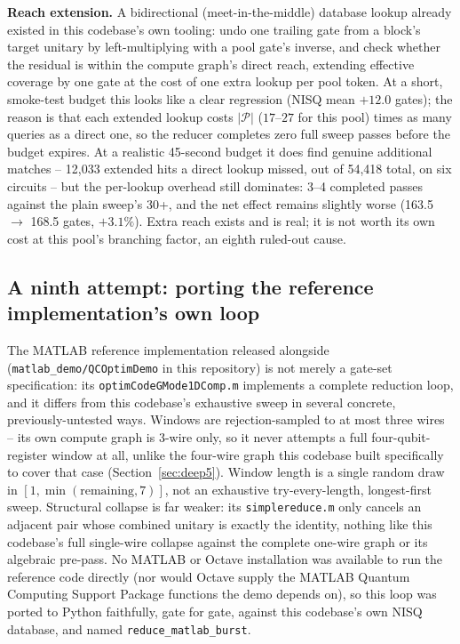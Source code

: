 \documentclass[11pt]{article}
\begin{document}
\textbf{Reach extension.} A bidirectional (meet-in-the-middle) database
lookup already existed in this codebase's own tooling: undo one trailing
gate from a block's target unitary by left-multiplying with a pool gate's
inverse, and check whether the residual is within the compute graph's
direct reach, extending effective coverage by one gate at the cost of one
extra lookup per pool token. At a short, smoke-test budget this looks like
a clear regression (NISQ mean $+12.0$ gates); the reason is that each
extended lookup costs $|\mathcal{P}|$ ($17$--$27$ for this pool) times as
many queries as a direct one, so the reducer completes zero full sweep
passes before the budget expires. At a realistic 45-second budget it does
find genuine additional matches -- 12{,}033 extended hits a direct lookup
missed, out of 54{,}418 total, on six circuits -- but the per-lookup
overhead still dominates: 3--4 completed passes against the plain sweep's
30+, and the net effect remains slightly worse (163.5 $\to$ 168.5 gates,
$+3.1\%$). Extra reach exists and is real; it is not worth its own cost
at this pool's branching factor, an eighth ruled-out cause.

\subsection{A ninth attempt: porting the reference implementation's own loop}
\label{sec:burst}

The MATLAB reference implementation released alongside
\cite{Rosenhahn2025Optimization} (\texttt{matlab\_demo/QCOptimDemo} in
this repository) is not merely a gate-set specification: its
\texttt{optimCodeGMode1DComp.m} implements a complete reduction loop, and
it differs from this codebase's exhaustive sweep in several concrete,
previously-untested ways. Windows are rejection-sampled to at most three
wires -- its own compute graph is 3-wire only, so it never attempts a
full four-qubit-register window at all, unlike the four-wire graph this
codebase built specifically to cover that case
(Section~\ref{sec:deep5}). Window length is a single random draw in
$[1,\min(\text{remaining},7)]$, not an exhaustive try-every-length,
longest-first sweep. Structural collapse is far weaker: its
\texttt{simplereduce.m} only cancels an adjacent pair whose combined
unitary is exactly the identity, nothing like this codebase's full
single-wire collapse against the complete one-wire graph or its algebraic
pre-pass. No MATLAB or Octave installation was available to run the
reference code directly (nor would Octave supply the MATLAB Quantum
Computing Support Package functions the demo depends on), so this loop
was ported to Python faithfully, gate for gate, against this codebase's
own NISQ database, and named \texttt{reduce\_matlab\_burst}.
\end{document}
